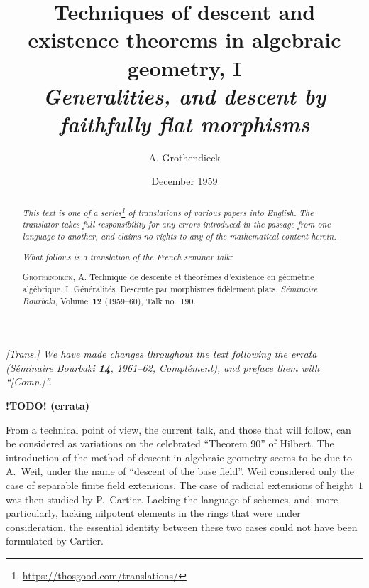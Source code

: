 \documentclass{article}
\title{Techniques of descent and existence theorems in algebraic geometry, I\\\emph{Generalities, and descent by faithfully flat morphisms}}
\author{A. Grothendieck}
\date{December 1959}
\theoremstyle{plain}
\theoremstyle{definition}
\newcommand{\todo}{\textbf{ !TODO! }}
\newcommand{\oldpage}[1]{\marginpar{\footnotesize$\Big\vert$ \textit{p.~#1}}}
\begin{document}
\maketitle
\thispagestyle{fancy}

\renewcommand{\abstractname}{Translator's note.}

\begin{abstract}
  \renewcommand*{\thefootnote}{\fnsymbol{footnote}}
  \emph{This text is one of a series\footnote{\url{https://thosgood.com/translations/}} of translations of various papers into English.}
  \emph{The translator takes full responsibility for any errors introduced in the passage from one language to another, and claims no rights to any of the mathematical content herein.}

  \medskip
  
  \emph{What follows is a translation of the French seminar talk:}

  \medskip\noindent
  \textsc{Grothendieck, A.}
  Technique de descente et th\'{e}or\`{e}mes d'existence en g\'{e}om\'{e}trie alg\'{e}brique. I. G\'{e}n\'{e}ralit\'{e}s. Descente par morphismes fid\`{e}lement plats.
  \emph{S\'{e}minaire Bourbaki}, Volume~\textbf{12} (1959--60), Talk no.~190.
\end{abstract}

\setcounter{footnote}{0}

\setcounter{tocdepth}{2}
\tableofcontents



\subsubsection*{}

\emph{[Trans.] We have made changes throughout the text following the errata (\emph{S\'{e}minaire Bourbaki} \textbf{14}, 1961--62, Compl\'{e}ment), and preface them with ``[Comp.]''.}
\medskip

\textbf{\todo(errata)}

\oldpage{190-01}
From a technical point of view, the current talk, and those that will follow, can be considered as variations on the celebrated ``Theorem 90'' of Hilbert.
The introduction of the method of descent in algebraic geometry seems to be due to A.~Weil, under the name of ``descent of the base field''.
Weil considered only the case of separable finite field extensions.
The case of radicial extensions of height~$1$ was then studied by P.~Cartier.
Lacking the language of schemes, and, more particularly, lacking nilpotent elements in the rings that were under consideration, the essential identity between these two cases could not have been formulated by Cartier.
\end{document}
